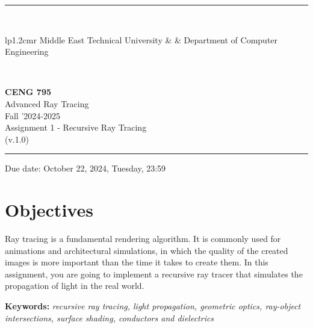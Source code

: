 \documentclass[12pt]{article}
\newcommand{\HRule}{\rule{\linewidth}{1mm}}
\begin{document}
\noindent \HRule \\[3mm]
\small
\begin{tabular}[b]{lp{1.2cm}r}
\href{https://www.metu.edu.tr/}{} Middle East Technical
University &  &
\href{https://ceng.metu.edu.tr/information}{} Department of Computer Engineering \\
\end{tabular} \\
\begin{center}

                 \LARGE \textbf{CENG 795} \\[4mm]
                 \Large Advanced Ray Tracing \\[4mm]
                \normalsize Fall '2024-2025 \\
                    \normalsize Assignment 1 - Recursive Ray Tracing \\
                    \normalsize (v.1.0)
\end{center}
\HRule

\begin{center}
Due date: October 22, 2024, Tuesday, 23:59
\end{center}


\section{Objectives}
Ray tracing is a fundamental rendering algorithm. It is commonly used
for animations and architectural simulations, in which the quality of
the created images is more important than the time it takes to create
them. In this assignment, you are going to implement a recursive ray 
tracer that simulates the propagation of light in the real world.

\vspace{0.5cm} \noindent \textbf{Keywords:} \emph{recursive ray tracing,
    light propagation, geometric optics, ray-object intersections,
    surface shading, conductors and dielectrics}
\end{document}

